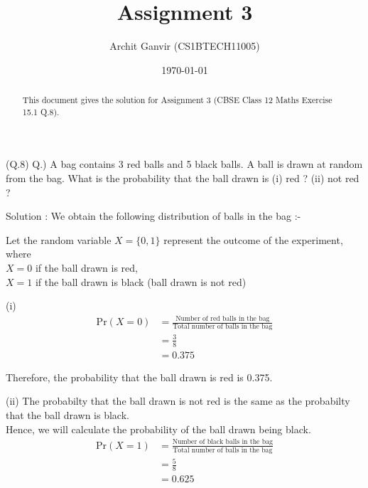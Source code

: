 \documentclass{beamer}
\title{Assignment 3}
\author{Archit Ganvir (CS1BTECH11005)}
\date{\today}
\begin{document}
\begin{frame}

\titlepage

\begin{abstract}
This document gives the solution for Assignment 3 (CBSE Class 12 Maths Exercise 15.1 Q.8).
\end{abstract}

\end{frame}

\begin{frame}

(Q.8) Q.) A bag contains 3 red balls and 5 black balls. A ball is drawn at random from the bag. What is the probability that the ball drawn is (i) red ? (ii) not red ?

\end{frame}

\begin{frame}

Solution : We obtain the following distribution of balls in the bag :-
\begin{table}[ht!]
	
\caption{}
\label{table:table1}

Let the random variable $X = \{0,1\}$ represent the outcome of the experiment, where\\
$X = 0$ if the ball drawn is red,\\
$X = 1$ if the ball drawn is black (ball drawn is not red)
	
\end{table}

\end{frame}

\begin{frame}

(i)
\begin{align}
\text{Pr} (X = 0) &= \frac{\text{Number of red balls in the bag}}{\text{Total number of balls in the bag}} \\
&= \frac{3}{8} \\
&= 0.375
\end{align}

Therefore, the probability that the ball drawn is red is 0.375.

\end{frame}

\begin{frame}

(ii) The probabilty that the ball drawn is not red is the same as the probabilty that the ball drawn is black.\\
Hence, we will calculate the probability of the ball drawn being black.\\

\begin{align}
\text{Pr} (X = 1) &= \frac{\text{Number of black balls in the bag}}{\text{Total number of balls in the bag}} \\
&= \frac{5}{8} \\
&= 0.625
\end{align}

\end{frame}
\end{document}
